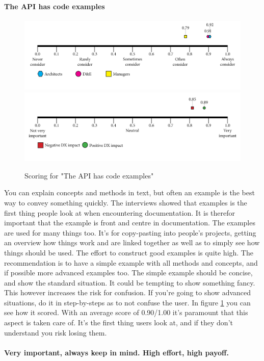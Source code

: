 \documentclass{article}
\begin{document}
\paragraph{The API has code examples}
\begin{figure}[H]
\centering
\includegraphics[width=\linewidth]{scorelines/aspect4.png}
\includegraphics[width=\linewidth]{dxscorelines/dxaspect4.png}
\caption{Scoring for "The API has code examples"}
\label{fig:aspect4}
\end{figure}
You can explain concepts and methods in text, but often an example is the best way to convey something quickly. The interviews showed that examples is the first thing people look at when encountering documentation. It is therefor important that the example is front and centre in documentation. The examples are used for many things too. It's for copy-pasting into people's projects, getting an overview how things work and are linked together as well as to simply see how things should be used. The effort to construct good examples is quite high. The recommendation is to  have a simple example with all methods and concepts, and if possible more advanced examples too. The simple example should be concise, and show the standard situation. It could be tempting to show something fancy. This however increases the risk for confusion. If you're going to show advanced situations, do it in step-by-steps as to not confuse the user. In figure \ref{fig:aspect4} you can see how it scored. With an average score of 0.90/1.00 it's paramount that this aspect is taken care of. It's the first thing users look at, and if they don't understand you risk losing them. \\ \\
\textbf{Very important, always keep in mind. High effort, high payoff.}
\end{document}
